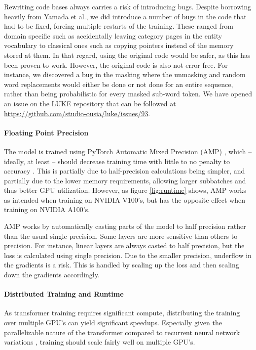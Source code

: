\documentclass[main.tex]{subfiles}
\begin{document}
Rewriting code bases always carries a risk of introducing bugs.
Despite borrowing heavily from Yamada et al., we did introduce a number of bugs in the code that had to be fixed, forcing multiple restarts of the training.
These ranged from domain specific such as accidentally leaving category pages in the entity vocabulary to classical ones such as copying pointers instead of the memory stored at them.
In that regard, using the original code would be safer, as this has been proven to work.
However, the original code is also not error free.
For instance, we discovered a bug in the masking where the unmasking and random word replacements would either be done or not done for an entire sequence, rather than being probabilistic for every masked sub-word token.
We have opened an issue on the LUKE repository that can be followed at \url{https://github.com/studio-ousia/luke/issues/93}.

\paragraph{Floating Point Precision}
The model is trained using PyTorch Automatic Mixed Precision (AMP) \cite{pytorchamp}, which -- ideally, at least -- should decrease training time with little to no penalty to accuracy \cite{huang2020amp}.
This is partially due to half-precision calculations being simpler, and partially due to the lower memory requirements, allowing larger subbatches and thus better GPU utilization.
However, as figure \ref{fig:runtime} shows, AMP works as intended when training on NVIDIA V100's, but has the opposite effect when training on NVIDIA A100's.

AMP works by automatically casting parts of the model to half precision rather than the usual single precision.
Some layers are more sensitive than others to precision.
For instance, linear layers are always casted to half precision, but the loss is calculated using single precision.
Due to the smaller precision, underflow in the gradients is a risk.
This is handled by scaling up the loss and then scaling down the gradients accordingly.
\cite{pytorchamp}

\paragraph{Distributed Training and Runtime}
As transformer training requires significant compute, distributing the training over multiple GPU's can yield significant speedups.
Especially given the parallelizable nature of the transformer compared to recurrent neural network variations \cite{vaswani2017att}, training should scale fairly well on multiple GPU's.
\end{document}

